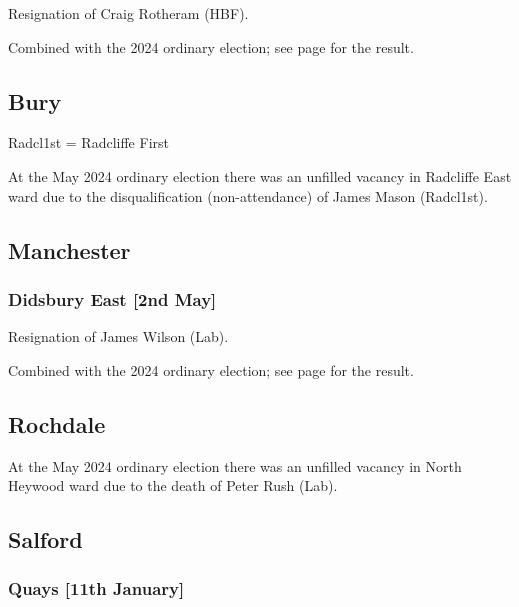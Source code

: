 \documentclass[a4paper,openany]{book}
\begin{document}
\begin{resultsiii}

Resignation of Craig Rotheram (HBF).

Combined with the 2024 ordinary election; see page \pageref{HorwichNorthBolton} for the result.

\subsection*{Bury}

Radcl1st = Radcliffe First

At the May 2024 ordinary election there was an unfilled vacancy in Radcliffe East ward due to the disqualification (non-attendance) of James Mason (Radcl1st).%

\subsection*{Manchester}

\subsubsection*{Didsbury East \hspace*{\fill}\nolinebreak[1]%
	\enspace\hspace*{\fill}
	[2nd May]}


Resignation of James Wilson (Lab).

Combined with the 2024 ordinary election; see page \pageref{DidsburyEastManchester} for the result.

\subsection*{Rochdale}

At the May 2024 ordinary election there was an unfilled vacancy in North Heywood ward due to the death of Peter Rush (Lab).%

\subsection*{Salford}

\subsubsection*{Quays \hspace*{\fill}\nolinebreak[1]%
	\enspace\hspace*{\fill}
	[11th January]}


\end{resultsiii}
\end{document}

